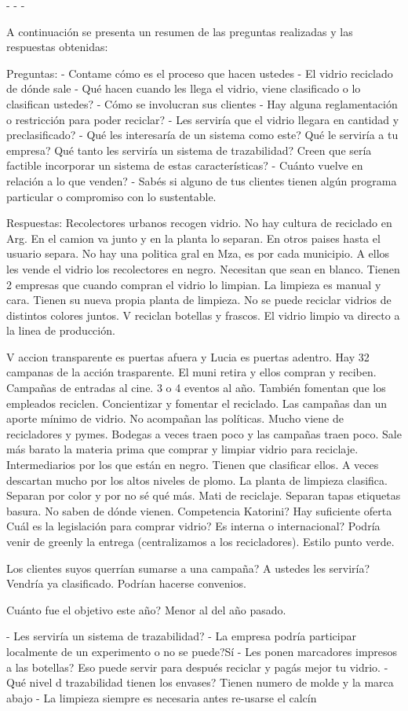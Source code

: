 -
- 
-

A continuación se presenta un resumen de las preguntas realizadas y las respuestas obtenidas:

Preguntas:
- Contame cómo es el proceso que hacen ustedes
- El vidrio reciclado de dónde sale
- Qué hacen cuando les llega el vidrio, viene clasificado o lo clasifican ustedes?
- Cómo se involucran sus clientes
- Hay alguna reglamentación o restricción para poder reciclar?
- Les serviría que el vidrio llegara en cantidad y preclasificado?
- Qué les interesaría de un sistema como este? Qué le serviría a tu empresa? Qué tanto les serviría un sistema de trazabilidad? Creen que sería factible incorporar un sistema de estas características?
- Cuánto vuelve en relación a lo que venden?
- Sabés si alguno de tus clientes tienen algún programa particular o compromiso con lo sustentable.

Respuestas:
Recolectores urbanos recogen vidrio.
No hay cultura de reciclado en Arg.
En el camion va junto y en la planta lo separan.
En otros paises hasta el usuario separa.
No hay una politica gral en Mza, es por cada municipio.
A ellos les vende el vidrio los recolectores en negro. Necesitan que sean en blanco. Tienen 2 empresas que cuando compran el vidrio lo limpian. La limpieza es manual y cara. Tienen su nueva propia planta de limpieza.
No se puede reciclar vidrios de distintos colores juntos.
V reciclan botellas y frascos. 
El vidrio limpio va directo a la linea de producción.

V accion transparente es puertas afuera y Lucia es puertas adentro. Hay 32 campanas de la acción trasparente. El muni retira y ellos compran y reciben.
Campañas de entradas al cine.
3 o 4 eventos al año. 
También fomentan que los empleados reciclen.
Concientizar y fomentar el reciclado.
Las campañas dan un aporte mínimo de vidrio.
No acompañan las políticas. 
Mucho viene de recicladores y pymes. Bodegas a veces traen poco y las campañas traen poco.
Sale más barato la materia prima que comprar y limpiar vidrio para reciclaje.
Intermediarios por los que están en negro.
Tienen que clasificar ellos. A veces descartan mucho por los altos niveles de plomo.
La planta de limpieza clasifica. Separan por color y por no sé qué más. Mati de reciclaje. Separan tapas etiquetas basura. No saben de dónde vienen. Competencia Katorini? 
Hay suficiente oferta
Cuál es la legislación para comprar vidrio? Es interna o internacional? Podría venir de greenly la entrega (centralizamos a los recicladores). Estilo punto verde.

Los clientes suyos querrían sumarse a una campaña? A ustedes les serviría? Vendría ya clasificado. Podrían hacerse convenios.

Cuánto fue el objetivo este año? Menor al del año pasado.


- Les serviría un sistema de trazabilidad?
- La empresa podría participar localmente de un experimento o no se puede?Sí
- Les ponen marcadores impresos a las botellas? Eso puede servir para después reciclar y pagás mejor tu vidrio.
- Qué nivel d trazabilidad tienen los envases? Tienen numero de molde y la marca abajo
- La limpieza siempre es necesaria antes re-usarse el calcín
